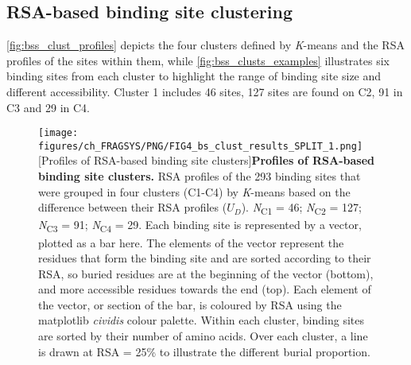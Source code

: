 {%

\subsection{RSA-based binding site clustering}

\autoref{fig:bss_clust_profiles} depicts the four clusters defined by \textit{K}-means and the RSA profiles of the sites within them, while \autoref{fig:bss_clusts_examples} illustrates six binding sites from each cluster to highlight the range of binding site size and different accessibility. Cluster 1 includes 46 sites, 127 sites are found on C2, 91 in C3 and 29 in C4.

\begin{figure}[htb!]
    \centering
    \texttt{[image: figures/ch\_FRAGSYS/PNG/FIG4\_bs\_clust\_results\_SPLIT\_1.png]}
    [Profiles of RSA-based binding site clusters]{\textbf{Profiles of RSA-based binding site clusters.} RSA profiles of the 293 binding sites that were grouped in four clusters (C1-C4) by \textit{K}-means based on the difference between their RSA profiles ($U_{D}$). \textit{N}\textsubscript{C1} = 46; \textit{N}\textsubscript{C2} = 127; \textit{N}\textsubscript{C3} = 91; \textit{N}\textsubscript{C4} = 29. Each binding site is represented by a vector, plotted as a bar here. The elements of the vector represent the residues that form the binding site and are sorted according to their RSA, so buried residues are at the beginning of the vector (bottom), and more accessible residues towards the end (top). Each element of the vector, or section of the bar, is coloured by RSA using the matplotlib \textit{cividis} colour palette. Within each cluster, binding sites are sorted by their number of amino acids. Over each cluster, a line is drawn at RSA = 25\% to illustrate the different burial proportion.}
\label{fig:bss_clust_profiles}
\end{figure}

}
